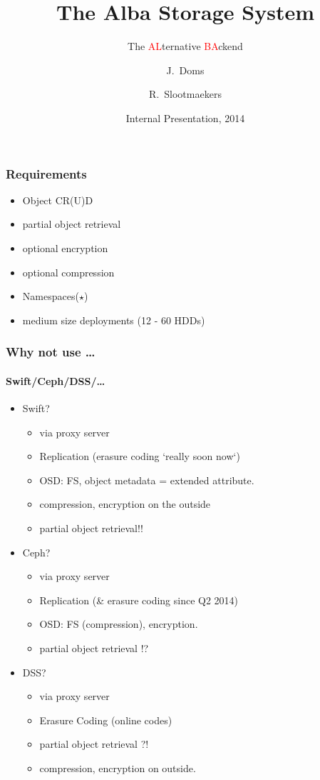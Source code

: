 \documentclass{beamer}
\title[Alba] %
{The Alba Storage System}
\subtitle{The \textcolor{red}{AL}ternative \textcolor{red}{BA}ckend}
\author[Slootmaekers, Doms] %
{J.~Doms \and R.~Slootmaekers}
\institute[Open vStorage] %
{
}
\date[Oct 2014] %
{Internal Presentation, 2014}
\begin{document}
\frame{\titlepage}
\begin{frame}
  \frametitle{Requirements}
  \begin{itemize}[<+->]
     \item Object CR(U)D
     \item partial object retrieval
     \item optional encryption
     \item optional compression
     \item Namespaces($\star$)
     \item medium size deployments \pause (12 - 60 HDDs)
  \end{itemize}
\end{frame}

\begin{frame}
  \frametitle{Why not use \ldots}
  \framesubtitle{Swift/Ceph/DSS/\ldots}
  \begin{itemize}[<+->]
    \item{Swift?}
      \begin{itemize}
        \item via proxy server
        \item Replication (erasure coding `really soon now`)
        \item OSD: FS, object metadata = extended attribute.
        \item compression, encryption on the outside
        \item partial object retrieval!!
      \end{itemize}
    \item{Ceph?}
        \begin{itemize}
          \item via proxy server
          \item Replication (\& erasure coding since Q2 2014)
          \item OSD: FS (compression), encryption.
          \item partial object retrieval !?
        \end{itemize}
    \item{DSS?}
        \begin{itemize}
          \item via proxy server
          \item Erasure Coding (online codes)
          \item partial object retrieval ?!
          \item compression, encryption on outside.
        \end{itemize}
  \end{itemize}

\end{frame}
\end{document}

